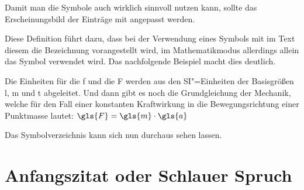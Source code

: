 \documentclass[english,ngerman]{tudscrartcl}
\begin{document}
Damit man die Symbole auch wirklich sinnvoll nutzen kann, sollte das 
Erscheinungsbild der Einträge mit  angepasst werden.
%
\begin{Tutorial}
\end{Tutorial}
%
Diese Definition führt dazu, dass bei der Verwendung eines Symbols mit
 im Text diesem die Bezeichnung vorangestellt 
wird, im Mathematikmodus allerdings allein das Symbol verwendet wird. Das 
nachfolgende Beispiel macht dies deutlich.
%
\begin{Tutorial}
Die Einheiten für die \gls{f} und die \gls{F} werden aus den SI"=Einheiten 
der Basisgrößen \gls{l}, \gls{m} und \gls{t} abgeleitet. Und dann gibt es
noch die Grundgleichung der Mechanik, welche für den Fall einer konstanten 
Kraftwirkung in die Bewegungsrichtung einer Punktmasse lautet:
$\gls{F} = \gls{m} \cdot \gls{a}$
\end{Tutorial}
%
Das Symbolverzeichnis kann sich nun durchaus sehen lassen.
%
\begin{Tutorial*}
\printsymbols[style=symbolslongtabu]
\end{Tutorial*}
\begin{Tutorial+}
\clearpage
\end{Tutorial+}
\begin{quoting}[rightmargin=0pt]
\printsymbols[style=symbolstabu]
\end{quoting}


\section{Anfangszitat oder Schlauer Spruch}
\end{document}
